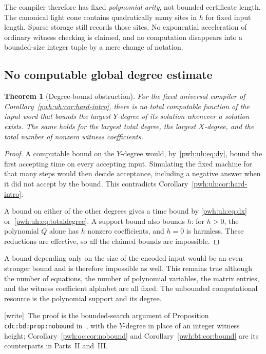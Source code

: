 \documentclass[11pt,letterpaper]{article}
\numberwithin{equation}{section}
\newtheorem{theorem}{Theorem}[section]
\theoremstyle{definition}
\newcommand{\wtag}{\textup{[write]}}
\begin{document}
The compiler therefore has fixed \emph{polynomial arity}, not bounded
certificate length. The canonical light cone contains quadratically many
sites in $h$ for fixed input length. Sparse storage still records those
sites. No exponential acceleration of ordinary witness checking is
claimed, and no computation disappears into a bounded-size integer tuple
by a mere change of notation.

\subsection{No computable global degree estimate}

\begin{theorem}[Degree-bound obstruction]
\label{pwh:uh:thm:nobound}
For the fixed universal compiler of Corollary~\ref{pwh:uh:cor:hard-intro}, there
is no total computable function of the input word that bounds the largest
$Y$-degree of its solution whenever a solution exists. The same holds for
the largest total degree, the largest $X$-degree, and the total number of
nonzero witness coefficients.
\end{theorem}

\begin{proof}
A computable bound on the $Y$-degree would, by~\eqref{pwh:uh:eq:dy}, bound the
first accepting time on every accepting input. Simulating the fixed
machine for that many steps would then decide acceptance, including a
negative answer when it did not accept by the bound. This contradicts
Corollary~\ref{pwh:uh:cor:hard-intro}.

A bound on either of the other degrees gives a time bound by
\eqref{pwh:uh:eq:dx} or~\eqref{pwh:uh:eq:totaldegree}. A support bound also bounds $h$:
for $h>0$, the polynomial $Q$ alone has $h$ nonzero coefficients, and
$h=0$ is harmless. These reductions are effective, so all the claimed
bounds are impossible.
\end{proof}

A bound depending only on the size of the encoded input would be an even
stronger bound and is therefore impossible as well. This remains true
although the number of equations, the number of polynomial variables,
the matrix entries, and the witness coefficient alphabet are all fixed.
The unbounded computational resource is the polynomial support and its
degree.

\wtag\ The proof is the bounded-search argument of Proposition
\texttt{cdc:bd:prop:nobound} in~\cite{cdc}, with the $Y$-degree in place of
an integer witness height; Corollary~\ref{pwh:oc:cor:nobound} and
Corollary~\ref{pwh:bt:cor:bound} are its counterparts in Parts~II and~III.
\end{document}
